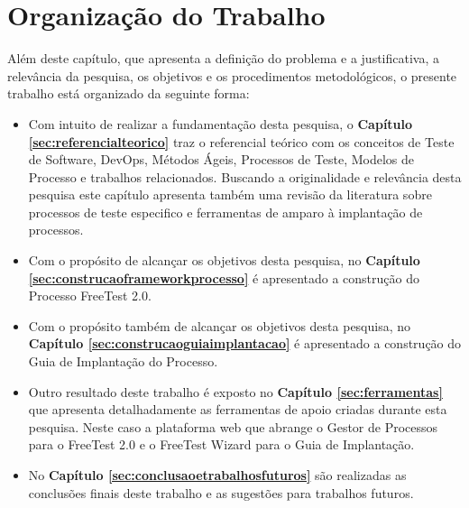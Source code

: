 \section{Organização do Trabalho}
\label{cap:estrutura}

Além deste capítulo, que apresenta a definição do problema e a justificativa, a relevância da pesquisa, os objetivos e os procedimentos metodológicos, o presente trabalho está organizado da seguinte forma:

\begin{itemize}
    \item Com intuito de realizar a fundamentação desta pesquisa, o \textbf{Capítulo     \ref{sec:referencialteorico}} traz o referencial teórico com os conceitos de Teste de Software, DevOps, Métodos Ágeis, Processos de Teste, Modelos de Processo e trabalhos relacionados. Buscando a originalidade e relevância desta pesquisa este capítulo apresenta também uma revisão da literatura sobre processos de teste especifico e ferramentas de amparo à implantação de processos.
    \item Com o propósito de alcançar os objetivos desta pesquisa, no \textbf{Capítulo \ref{sec:construcaoframeworkprocesso}} é apresentado a construção do Processo FreeTest 2.0.
    \item Com o propósito também de alcançar os objetivos desta pesquisa, no \textbf{Capítulo \ref{sec:construcaoguiaimplantacao}} é apresentado a construção do Guia de Implantação do Processo.
    \item Outro resultado deste trabalho é exposto no \textbf{Capítulo \ref{sec:ferramentas}} que apresenta detalhadamente as ferramentas de apoio criadas durante esta pesquisa. Neste caso a plataforma web que abrange o Gestor de Processos para o FreeTest 2.0 e o FreeTest Wizard para o Guia de Implantação.
    \item No \textbf{Capítulo \ref{sec:conclusaoetrabalhosfuturos}} são realizadas as conclusões finais deste trabalho e as sugestões para trabalhos futuros.
\end{itemize}